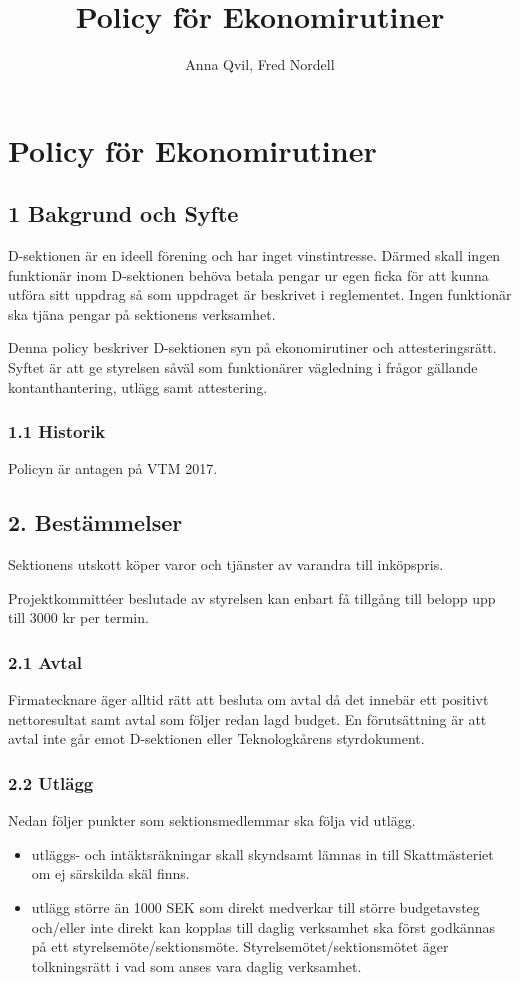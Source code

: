 \documentclass{dsekkallelse}
\title{Policy för Ekonomirutiner}
\author{Anna Qvil, Fred Nordell}
\begin{document}
\section{Policy för Ekonomirutiner}

\subsection{1 Bakgrund och Syfte}
D-sektionen är en ideell förening och har inget vinstintresse. Därmed skall ingen funktionär inom D-sektionen behöva betala pengar ur egen ficka för att kunna utföra sitt uppdrag så som uppdraget är beskrivet i reglementet. Ingen funktionär ska tjäna pengar på sektionens verksamhet.
\par Denna policy beskriver D-sektionen syn på ekonomirutiner och attesteringsrätt. Syftet är att ge styrelsen såväl som funktionärer vägledning i frågor gällande kontanthantering, utlägg samt attestering. 

\subsubsection{1.1 Historik}
Policyn är antagen på VTM 2017.  

\subsection{2. Bestämmelser}
Sektionens utskott köper varor och tjänster av varandra till inköpspris.

Projektkommittéer beslutade av styrelsen kan enbart få tillgång till belopp upp till 3000 kr per termin.

\subsubsection{2.1 Avtal}
Firmatecknare äger alltid rätt att besluta om avtal då det innebär ett
positivt nettoresultat samt avtal som följer redan lagd budget. En förutsättning är att avtal
inte går emot D-sektionen eller Teknologkårens styrdokument.
\subsubsection{2.2 Utlägg}
Nedan följer punkter som sektionsmedlemmar ska följa vid utlägg.
\begin{itemize}
\item utläggs- och intäktsräkningar skall skyndsamt lämnas in till Skattmästeriet om ej särskilda skäl finns.
\item utlägg större än 1000 SEK som direkt medverkar till större budgetavsteg och/eller inte direkt kan kopplas till daglig verksamhet ska först godkännas på ett styrelsemöte/sektionsmöte. Styrelsemötet/sektionsmötet äger tolkningsrätt i vad som anses vara daglig verksamhet. 
\end{itemize}
\end{document}
